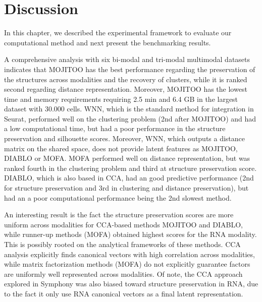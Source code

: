 \section{Discussion}

In this chapter, we described the experimental framework to evaluate our computational method and next present the benchmarking results.

A comprehensive analysis with six bi-modal and tri-modal multimodal datasets indicates that MOJITOO has the best performance regarding the preservation of the structures across modalities and the recovery of clusters, while it is ranked second regarding distance representation. Moreover, MOJITOO has the lowest time and memory requirements requiring 2.5 min and 6.4 GB in the largest dataset with 30.000 cells. WNN, which is the standard method for integration in Seurat, performed well on the clustering problem (2nd after MOJITOO) and had a low computational time, but had a poor performance in the structure preservation and silhouette scores. Moreover, WNN, which outputs a distance matrix on the shared space, does not provide latent features as MOJITOO, DIABLO or MOFA. MOFA performed well on distance representation, but was ranked fourth in the clustering problem and third at structure preservation score. DIABLO, which is also based in CCA, had an good predictive performance (2nd for structure preservation and 3rd in clustering and distance preservation), but had an a poor computational performance being the 2nd slowest method.

An interesting result is the fact the structure preservation scores are more uniform across modalities for CCA-based methods MOJITOO and DIABLO, while runner-up methods (MOFA) obtained highest scores for the RNA modality. This is possibly rooted on the analytical frameworks of these methods. CCA analysis explicitly finds canonical vectors with high correlation across modalities, while matrix factorization methods (MOFA) do not explicitly guarantee factors are uniformly well represented across modalities. Of note, the CCA approach explored in Symphony was also biased toward structure preservation in RNA, due to the fact it only use RNA canonical vectors as a final latent representation. 

